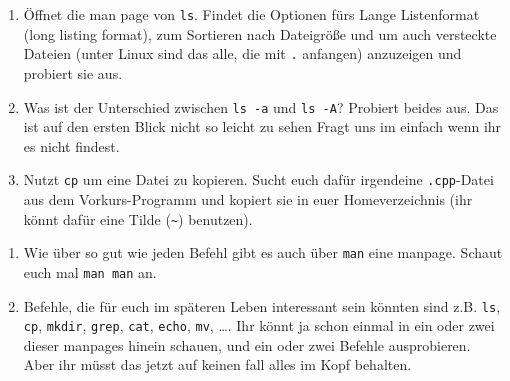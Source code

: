 \begin{praxis}
    \begin{enumerate}[resume]
        \item Öffnet die man page von \texttt{ls}. Findet die Optionen fürs Lange
              Listenformat (long listing format), zum Sortieren nach Dateigröße
              und um auch versteckte Dateien (unter Linux sind das alle, die mit
              \texttt{.} anfangen) anzuzeigen und probiert sie aus.
        \item Was ist der Unterschied zwischen \texttt{ls -a} und \texttt{ls -A}?
              Probiert beides aus. Das ist auf den ersten Blick nicht so leicht zu sehen
              Fragt uns im einfach wenn ihr es nicht findest.
        \item Nutzt \texttt{cp} um eine Datei zu kopieren. Sucht euch dafür
              irgendeine \texttt{.cpp}-Datei aus dem Vorkurs-Programm und kopiert sie
              in euer Homeverzeichnis (ihr könnt dafür eine Tilde (\texttt{\~})
              benutzen).
    \end{enumerate}
\end{praxis}

\begin{spiel}
    \begin{enumerate}
        \item Wie über so gut wie jeden Befehl gibt es auch über \texttt{man} eine
              manpage. Schaut euch mal \texttt{man man} an.
        \item Befehle, die für euch im späteren Leben interessant sein könnten sind
              z.B. \texttt{ls}, \texttt{cp}, \texttt{mkdir}, \texttt{grep}, \texttt{cat},
              \texttt{echo}, \texttt{mv}, \dots. Ihr könnt ja schon einmal in ein
              oder zwei dieser manpages hinein schauen, und ein oder zwei Befehle
              ausprobieren. Aber ihr müsst das jetzt auf keinen fall alles im Kopf
              behalten.
    \end{enumerate}
\end{spiel}
